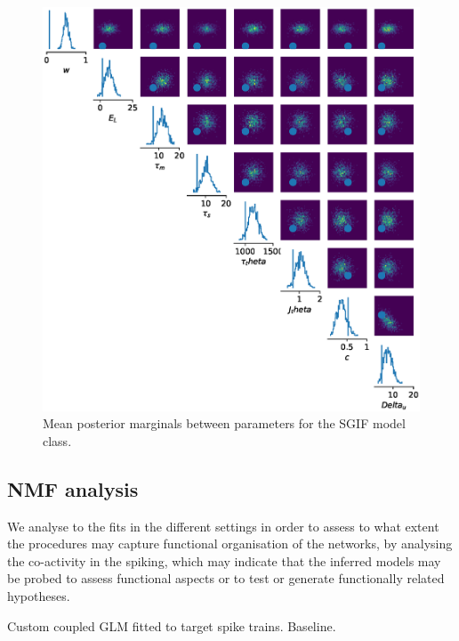 \documentclass[mphil,deptreport,ianc]{infthesis} %
\begin{document}
\begin{figure}
    \centering
	\includegraphics[width=0.85\columnwidth]{figures/sbi_p_avgs_pairplot_SNPE_microGIF_12-14_16-14-12-736.eps}
	\caption{Mean posterior marginals between parameters for the SGIF model class.}
\end{figure}



\subsection{NMF analysis}

We analyse to the fits in the different settings in order to assess to what extent the procedures may capture functional organisation of the networks, by analysing the co-activity in the spiking, which may indicate that the inferred models may be probed to assess functional aspects or to test or generate functionally related hypotheses.

Custom coupled GLM fitted to target spike trains. Baseline.
\end{document}
